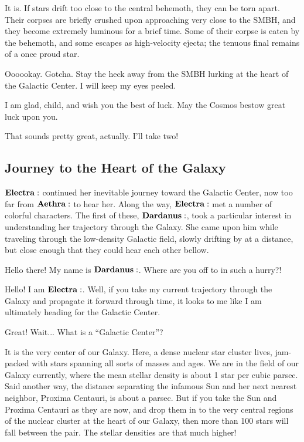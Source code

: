 \documentclass[main.tex]{subfiles}
\begin{document}
\Aethra It is.  If stars drift too close to the central behemoth, they can be torn apart.  Their corpses are briefly crushed upon approaching very close to the SMBH, and they become extremely luminous for a brief time.  Some of their corpse is eaten by the behemoth, and some escapes as high-velocity ejecta; the tenuous final remains of a once proud star.

\Elctra Oooookay.  Gotcha.  Stay the heck away from the SMBH lurking at the heart of the Galactic Center.  I will keep my eyes peeled.

\Aethra I am glad, child, and wish you the best of luck.  May the Cosmos bestow great luck upon you.

\Electra That sounds pretty great, actually.  I'll take two!

\subsection{Journey to the Heart of the Galaxy} \label{journey}

$\Electra$ continued her inevitable journey toward the Galactic Center, now too far from $\Aethra$ to hear her.  Along the way, $\Electra$ met a number of colorful characters.  The first of these, $\Dardanus$, took a particular interest in understanding her trajectory through the Galaxy.  She came upon him while traveling through the low-density Galactic field, slowly drifting by at a distance, but close enough that they could hear each other bellow.

\Dardanus Hello there!  My name is $\Dardanus$.  Where are you off to in such a hurry?!

\Electra  Hello!  I am $\Electra$.  Well, if you take my current trajectory through the Galaxy and propagate it forward through time, it looks to me like I am ultimately heading for the Galactic Center.

\Dardanus  Great!  Wait... What is a ``Galactic Center''?

\Electra  It is the very center of our Galaxy.  Here, a dense nuclear star cluster lives, jam-packed with stars spanning all sorts of masses and ages.  We are in the field of our Galaxy currently, where the mean stellar density is about 1 star per cubic parsec.  Said another way, the distance separating the infamous Sun and her next nearest neighbor, Proxima Centauri, is about a parsec.  But if you take the Sun and Proxima Centauri as they are now, and drop them in to the very central regions of the nuclear cluster at the heart of our Galaxy, then more than 100 stars will fall between the pair.  The stellar densities are that much higher!
\end{document}
